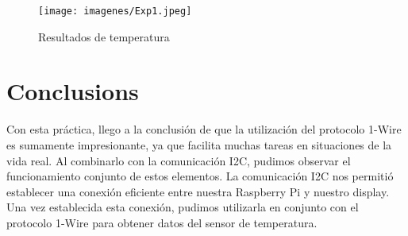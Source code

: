 \documentclass[letterpaper,12pt]{article}
\begin{document}
	\begin{figure}[h]
		\centering
		\texttt{[image: imagenes/Exp1.jpeg]}
		\caption{Resultados de temperatura}
		\label{fig:imagen}
	\end{figure}
	
		
	\section{Conclusions}

	Con esta práctica, llego a la conclusión de que la utilización del protocolo 1-Wire es sumamente impresionante, ya que facilita muchas tareas en situaciones de la vida real. Al combinarlo con la comunicación I2C, pudimos observar el funcionamiento conjunto de estos elementos. La comunicación I2C nos permitió establecer una conexión eficiente entre nuestra Raspberry Pi y nuestro display. Una vez establecida esta conexión, pudimos utilizarla en conjunto con el protocolo 1-Wire para obtener datos del sensor de temperatura.
	
	
	
\end{document}
